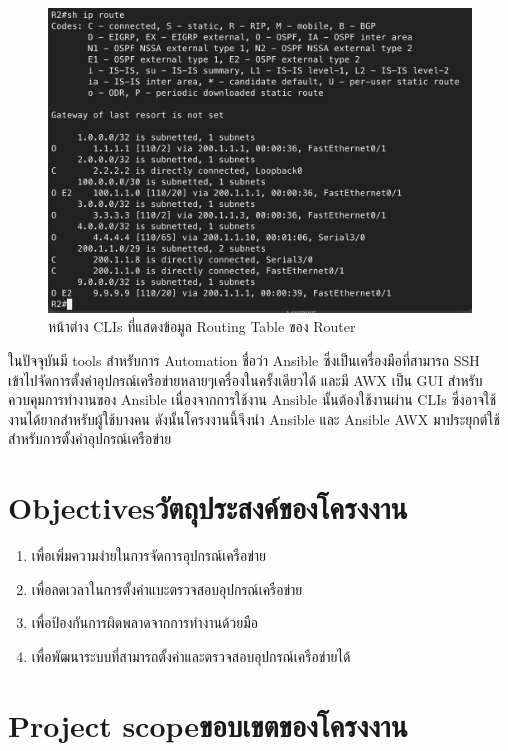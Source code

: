   \begin{figure}[h]
    \begin{center}
      \includegraphics[scale=0.4]{shRoute.png}
    \end{center}
    \caption[หน้าต่าง CLIs ที่แสดงข้อมูล Routing Table ของ Router]{หน้าต่าง CLIs ที่แสดงข้อมูล Routing Table ของ Router}
    \label{fig:shRoute}
  \end{figure}
  \hspace{0.5in}
ในปัจจุบันมี tools สำหรับการ Automation ชื่อว่า Ansible ซึ่งเป็นเครื่องมือที่สามารถ SSH เข้าไปจัดการตั้งค่าอุปกรณ์เครือข่ายหลายๆเครื่องในครั้งเดียวได้ และมี AWX เป็น GUI สำหรับควบคุมการทำงานของ Ansible เนื่องจากการใช้งาน Ansible นั้นต้องใช้งานผ่าน CLIs ซึ่งอาจใช้งานได้ยากสำหรับผู้ใช้บางคน
ดังนั้นโครงงานนี้จึงนำ Ansible และ Ansible AWX มาประยุกต์ใช้สำหรับการตั้งค่าอุปกรณ์เครือข่าย
\section{\ifenglish Objectives\else วัตถุประสงค์ของโครงงาน\fi}
\begin{enumerate}
    \item {เพื่อเพิ่มความง่ายในการจัดการอุปกรณ์เครือข่าย}
    \item {เพื่อลดเวลาในการตั้งค่าแบะตรวจสอบอุปกรณ์เครือข่าย}
    \item {เพื่อป้องกันการผิดพลาดจากการทำงานด้วยมือ}
    \item {เพื่อพัฒนาระบบที่สามารถตั้งค่าและตรวจสอบอุปกรณ์เครือข่ายได้}
\end{enumerate}

\section{\ifenglish Project scope\else ขอบเขตของโครงงาน\fi}
